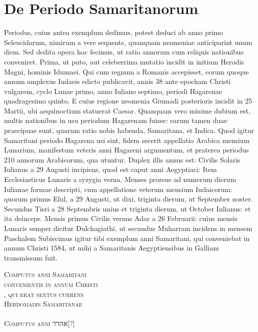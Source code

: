 \section{De Periodo Samaritanorum}
%
Periodus, cuius antea exemplum dedimus, potest deduci ab
anno primo Seleucidarum, nimirum a vere sequente, quanquam
neomeniae anticiparint unum diem.
Sed dedita opera hoc fecimus,
ut ratio annorum cum reliquis nationibus conveniret.
Prima,
ut puto, aut celeberrima mutatio incidit in initium Herodis
Magni, hominis Idumaei.
Qui cum regnum a Romanis accepisset, eorum
quoque annum amplexus Iudaeis edicto publicavit, annis 38
ante epocham Christi vulgarem, cyclo Lunae primo, anno Iuliano
septimo, periodi Hagarenae quadragesimo quinto.
E cuius regione
neomenia Giumadi posterioris incidit in 25 Martii, ubi aequinoctium
statuerat Caesar.
Quanquam vero minime dubium est, multis
nationibus in usu periodum Hagarenam fuisse: earum tamen duae praecipuae
sunt, quarum ratio nobis habenda, Samaritana, et Indica.
Quod
igitur Samaritani periodo Hagarena usi sint, fidem secerit appellatio
Arabica mensium Lunarium, manifestum veteris anni Hagareni argumentum,
et praterea periodus 210 annorum Arabicorum, qua
utuntur.
Duplex illis annus est: Civilis Solaris Iulianus a 29 Augusti
incipiens, quod est caput anni Aegyptiaci: Item Ecclesiasticus
Lunaris a syzygia verna.
Menses prorsus ad numerum dierum Iulianae
formae descripti, cum appellatione veterum mensium Iudaicorum:
quorum primus Elul, a 29 Augusti, ut dixi, triginta dierum, ut September
noster. %
Secundus Tisri a 28 Septembris unius et triginta dierum,
ut October Iulianus: et ita deinceps.
Mensis primus Civilis
vernus Adar a 26 Februarii: cuius mensis Lunaris semper dicitur
Dulchagiathi, ut secundus Muharram incidens in mensem Paschalem
Subiecimus igitur tibi exemplum anni Samaritani, qui conveniebat
in annum Christi 1584, ut mihi a Samaritanis Aegyptiensibus in
Galliam transmissum fuit.
%
\begin{center}
\huge\textsc{Computus anni Samaritani}\\
\Large\textsc{convenientis in annum Christi}\\
\large{}\textsc{, qui erat sextus currens}\\
\large\textsc{Hebdomadis Samaritanae}\\
~\\
\large\textsc{Computus anni} \texthebrew{אהרר}[?]\\
\end{center}

